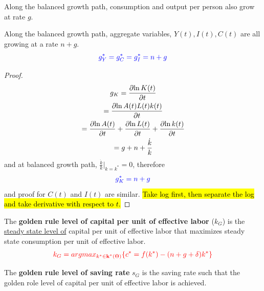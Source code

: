 \documentclass[11pt]{article}
\begin{document}
			\begin{proposition}
				Along the balanced growth path, consumption and output per person also grow at rate $g$.
			\end{proposition}
			
			\begin{proposition}
				Along the balanced growth path, aggregate variables, $Y(t), I(t), C(t)$ are all growing at a rate $n + g$.
				\begin{equation}
					\textcolor{blue}{
						g_{Y}^* = g_{C}^* = g_{I}^* = n + g
						}
				\end{equation}
			\end{proposition}
			\begin{proof}
				\begin{gather}
				g_{K} = \frac{\partial{\ln{K(t)}}}{\partial{t}} \\
				= \frac{\partial{\ln{A(t)L(t)k(t)}}}{\partial{t}} \\
				= \frac{\partial{\ln{A(t)}}}{\partial{t}} + \frac{\partial{\ln{L(t)}}}{\partial{t}} + \frac{\partial{\ln{k(t)}}}{\partial{t}} \\
				= g + n + \frac{\dot{k}}{k}
				\end{gather}
				and at balanced growth path, $\frac{\dot{k}}{k}|_{k=k^*} = 0$, therefore 
				\begin{equation}
					\textcolor{blue}{
						g_K^* = n + g
					}
				\end{equation}
				and proof for $C(t)$ and $I(t)$ are similar. \hl{Take log first, then separate the log and take derivative with respect to $t$.}
			\end{proof}
		
		\begin{definition}
			The \textbf{golden rule level of capital per unit of effective labor} ($k_G$) is the \ul{steady state level of} capital per unit of effective labor that maximizes steady state consumption per unit of effective labor.
				\begin{equation}
				\textcolor{red}{
					k_G = argmax_{k^* \in \textbf{k}^*(\Theta)} \{c^* = f(k^*) - (n+g+ \delta) k^*\}
					}
				\end{equation}
		\end{definition}
		
		\begin{definition}
			The \textbf{golden rule level of saving rate} $s_G$ is the saving rate such that the golden role level of capital per unit of effective labor is achieved.
		\end{definition}
		
\end{document}
